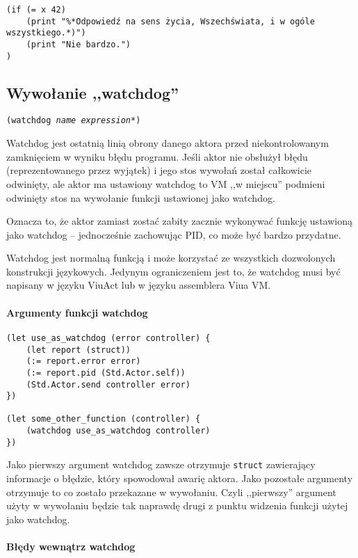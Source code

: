 \begin{lstlisting}
(if (= x 42)
    (print "%*Odpowiedź na sens życia, Wszechświata, i w ogóle wszystkiego.*)")
    (print "Nie bardzo.")
)
\end{lstlisting}

\subsection{Wywołanie ,,watchdog''}

\texttt{(watchdog \emph{name} \emph{expression}*)}
\newline

Watchdog jest ostatnią linią obrony danego aktora przed niekontrolowanym zamknięciem w wyniku błędu programu.
Jeśli aktor nie obsłużył błędu (reprezentowanego przez wyjątek) i jego stos wywołań został całkowicie
odwinięty, ale aktor ma ustawiony watchdog to VM ,,w miejscu'' podmieni odwinięty stos na wywołanie funkcji
ustawionej jako watchdog.

Oznacza to, że aktor zamiast zostać zabity zacznie wykonywać funkcję ustawioną jako watchdog -- jednocześnie
zachowując PID, co może być bardzo przydatne.

Watchdog jest normalną funkcją i może korzystać ze wszystkich dozwolonych konstrukcji językowych.
Jedynym ograniczeniem jest to, że watchdog musi być napisany w języku ViuAct lub w języku assemblera Viua VM.

\paragraph*{Argumenty funkcji watchdog}

\begin{lstlisting}
(let use_as_watchdog (error controller) {
    (let report (struct))
    (:= report.error error)
    (:= report.pid (Std.Actor.self))
    (Std.Actor.send controller error)
})

(let some_other_function (controller) {
    (watchdog use_as_watchdog controller)
})
\end{lstlisting}

Jako pierwszy argument watchdog zawsze otrzymuje \texttt{struct} zawierający informacje o błędzie, który
spowodował awarię aktora. Jako pozostałe argumenty otrzymuje to co zostało przekazane w wywołaniu.
Czyli ,,pierwszy'' argument użyty w wywołaniu będzie tak naprawdę drugi z punktu widzenia funkcji użytej jako
watchdog.

\paragraph*{Błędy wewnątrz watchdog}

